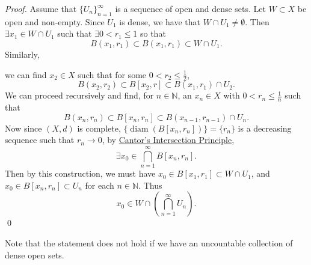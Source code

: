 \documentclass[notoc,notitlepage]{tufte-book}
\DeclareMathOperator{\diam}{diam }
\begin{document}
\begin{proof}
  Assume that $\{ U_n \}_{n = 1}^{\infty}$ is a sequence of open and dense sets. Let $W \subset X$ be open and non-empty. Since $U_1$ is dense, we have that $W \cap U_1 \neq \emptyset$. Then $\exists x_1 \in W \cap U_1$ such that $\exists 0 < r_1 \leq 1$ so that
  \begin{equation*}
    B(x_1, r_1) \subset B(x_1, r_1) \subset W \cap U_1.
  \end{equation*}
  Similarly,
  \begin{marginfigure}
    \centering
    \caption{Visualization of proof for Baire Category Theorem I}\label{fig:visualization_of_proof_for_baire_category_theorem_i}
  \end{marginfigure}
  we can find $x_2 \in X$ such that for some $0 < r_2 \leq \frac{1}{2}$,
  \begin{equation*}
    B ( x_2 , r_2 ) \subset B [ x_2, r ] \subset B(x_1, r_1) \cap U_2.
  \end{equation*}
  We can proceed recursively and find, for $n \in \mathbb{N}$, an $x_{n} \in X$ with $0 < r_{n} \leq \frac{1}{n}$ such that
  \begin{equation*}
    B ( x_n, r_n ) \subset B [ x_n, r_n ] \subset B ( x_{n - 1}, r_{n - 1} ) \cap U_{n}.
  \end{equation*}
  Now since $(X, d)$ is complete, $\{ \diam( B [x_n, r_n] ) \} = \{ r_n \}$ is a decreasing sequence such that $r_n \to 0$, by \hyperref[thm:cantor_s_intersection_principle]{Cantor's Intersection Principle},
  \begin{equation*}
    \exists x_0 \in \bigcap_{n=1}^{\infty} B[x_n, r_n].
  \end{equation*}
  Then by this construction, we must have $x_0 \in B[x_1, r_1] \subset W \cap U_1$, and $x_0 \in B[ x_n, r_n ] \subset U_n$ for each $n \in \mathbb{N}$. Thus
  \begin{equation*}
    x_0 \in W \cap \left( \bigcap_{n=1}^{\infty} U_n \right).
  \end{equation*}\qed\
\end{proof}

Note that the statement does not hold if we have an uncountable collection of dense open sets.
\end{document}
